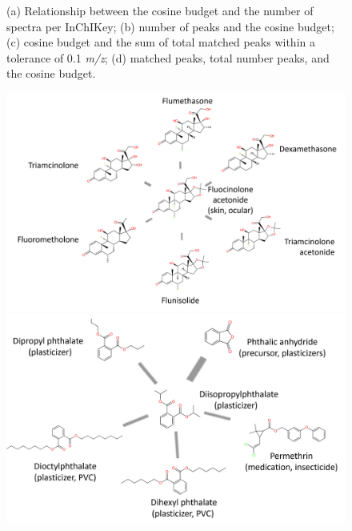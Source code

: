 \begin{figure}[htbp]
\begin{subfigure}[b]{0.49\textwidth}
        \caption{}
        \label{fig:circles_cosine}
        \vspace{0.1cm}
        \begin{minipage}[t]{\textwidth}
        \end{minipage}
    \end{subfigure}
    \caption{(a) Relationship between the cosine budget and the number of spectra per InChIKey; (b) number of peaks and the cosine budget; (c) cosine budget and the sum of total matched peaks within a tolerance of 0.1 \textit{m/z};  (d) matched peaks, total number peaks, and the cosine budget.}
    \label{fig:22subfigures}
\end{figure}


\begin{figure}
    \centering
  \begin{minipage}[b]{0.9\textwidth}
    \centering
    \includegraphics[width=\textwidth]{include/img/appendix/net_structures/steroids.png}
  \end{minipage}
  \hfill
  \begin{minipage}[b]{0.8\textwidth}
    \centering
    \includegraphics[width=\textwidth]{include/img/appendix/net_structures/phthalates.png}

\end{minipage}
\end{figure}
